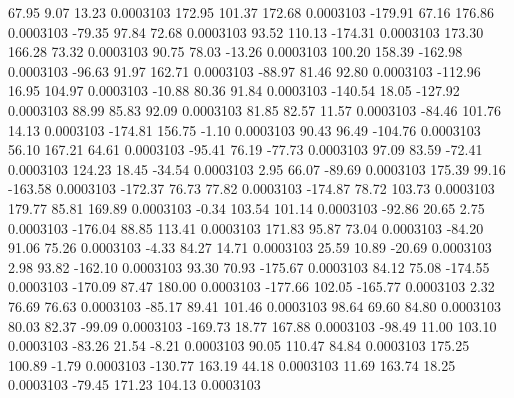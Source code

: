        67.95        9.07       13.23     0.0003103
      172.95      101.37      172.68     0.0003103
     -179.91       67.16      176.86     0.0003103
      -79.35       97.84       72.68     0.0003103
       93.52      110.13     -174.31     0.0003103
      173.30      166.28       73.32     0.0003103
       90.75       78.03      -13.26     0.0003103
      100.20      158.39     -162.98     0.0003103
      -96.63       91.97      162.71     0.0003103
      -88.97       81.46       92.80     0.0003103
     -112.96       16.95      104.97     0.0003103
      -10.88       80.36       91.84     0.0003103
     -140.54       18.05     -127.92     0.0003103
       88.99       85.83       92.09     0.0003103
       81.85       82.57       11.57     0.0003103
      -84.46      101.76       14.13     0.0003103
     -174.81      156.75       -1.10     0.0003103
       90.43       96.49     -104.76     0.0003103
       56.10      167.21       64.61     0.0003103
      -95.41       76.19      -77.73     0.0003103
       97.09       83.59      -72.41     0.0003103
      124.23       18.45      -34.54     0.0003103
        2.95       66.07      -89.69     0.0003103
      175.39       99.16     -163.58     0.0003103
     -172.37       76.73       77.82     0.0003103
     -174.87       78.72      103.73     0.0003103
      179.77       85.81      169.89     0.0003103
       -0.34      103.54      101.14     0.0003103
      -92.86       20.65        2.75     0.0003103
     -176.04       88.85      113.41     0.0003103
      171.83       95.87       73.04     0.0003103
      -84.20       91.06       75.26     0.0003103
       -4.33       84.27       14.71     0.0003103
       25.59       10.89      -20.69     0.0003103
        2.98       93.82     -162.10     0.0003103
       93.30       70.93     -175.67     0.0003103
       84.12       75.08     -174.55     0.0003103
     -170.09       87.47      180.00     0.0003103
     -177.66      102.05     -165.77     0.0003103
        2.32       76.69       76.63     0.0003103
      -85.17       89.41      101.46     0.0003103
       98.64       69.60       84.80     0.0003103
       80.03       82.37      -99.09     0.0003103
     -169.73       18.77      167.88     0.0003103
      -98.49       11.00      103.10     0.0003103
      -83.26       21.54       -8.21     0.0003103
       90.05      110.47       84.84     0.0003103
      175.25      100.89       -1.79     0.0003103
     -130.77      163.19       44.18     0.0003103
       11.69      163.74       18.25     0.0003103
      -79.45      171.23      104.13     0.0003103

